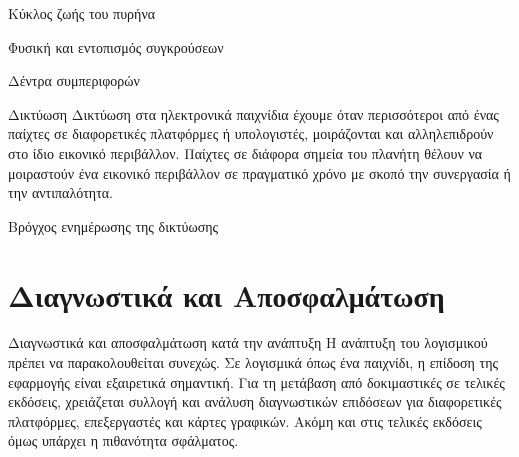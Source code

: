 \documentclass{beamer}
\begin{document}
	\begin{frame}{Κύκλος ζωής του πυρήνα}
		\begin{figure}
			\centering
			\resizebox{5.0cm}{!}{}
		\end{figure}
		\cite{citeulike:13049596}	
	\end{frame}

	\begin{frame}{Φυσική και εντοπισμός συγκρούσεων}
		\begin{figure}
			\centering
			\resizebox{10.5cm}{!}{}
		\end{figure}
		\cite{realtime_collision04}
	\end{frame}
	
	\begin{frame}{Δέντρα συμπεριφορών}
		\begin{figure}
			\centering
			\resizebox{10.5cm}{!}{}
		\end{figure}
		\cite{champandard2007understanding}
	\end{frame}

	\begin{frame}{Δικτύωση}
		Δικτύωση στα ηλεκτρονικά παιχνίδια έχουμε όταν περισσότεροι από ένας παίχτες σε διαφορετικές πλατφόρμες ή υπολογιστές, μοιράζονται και αλληλεπιδρούν στο ίδιο εικονικό περιβάλλον. Παίχτες σε διάφορα σημεία του πλανήτη θέλουν να μοιραστούν ένα εικονικό περιβάλλον σε πραγματικό χρόνο με σκοπό την συνεργασία ή την αντιπαλότητα.
		\cite{sanja14}
	\end{frame}
	
	\begin{frame}{Βρόγχος ενημέρωσης της δικτύωσης}
		\begin{figure}
			\centering
			\resizebox{10.5cm}{!}{}
		\end{figure}
	\end{frame}
	
	\section{Διαγνωστικά και Αποσφαλμάτωση}
	\begin{frame}{Διαγνωστικά και αποσφαλμάτωση κατά την ανάπτυξη}
		Η ανάπτυξη του λογισμικού πρέπει να παρακολουθείται συνεχώς. Σε λογισμικά όπως ένα παιχνίδι, η επίδοση της εφαρμογής είναι εξαιρετικά σημαντική. Για τη μετάβαση από δοκιμαστικές σε τελικές εκδόσεις, χρειάζεται συλλογή και ανάλυση διαγνωστικών επιδόσεων για διαφορετικές πλατφόρμες, επεξεργαστές και κάρτες γραφικών. Ακόμη και στις τελικές εκδόσεις όμως υπάρχει η πιθανότητα σφάλματος.         \cite{richter2012clr}
	\end{frame}
	
\end{document}
